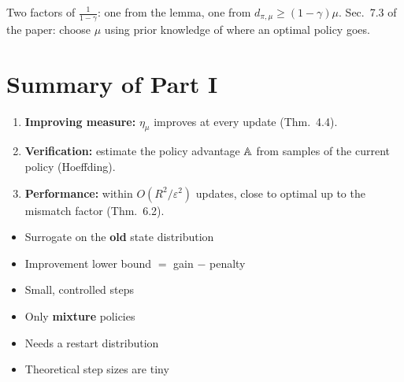 {\small Two factors of $\frac1{1-\gamma}$: one from the lemma, one from $d_{\pi,\mu}\ge(1-\gamma)\mu$. Sec.~7.3 of the paper: choose $\mu$ using prior knowledge of where an optimal policy goes.}

\section{Summary of Part I}

\begin{tcolorbox}[notes, colback=GoodGreen!5, colframe=GoodGreen, colbacktitle=GoodGreen, title={CPI's answers to the three questions}]
\begin{enumerate}[label=\textbf{Q\arabic*}]
  \item \textbf{Improving measure:} $\eta_\mu$ improves at every update (Thm.~4.4).
  \item \textbf{Verification:} estimate the policy advantage $\mathbb{A}$ from samples of the current policy (Hoeffding).
  \item \textbf{Performance:} within $O(R^2/\varepsilon^2)$ updates, close to optimal up to the mismatch factor (Thm.~6.2).
\end{enumerate}
\end{tcolorbox}

\begin{pair}
\begin{keybox}[title={Kept going forward}]
\begin{itemize}
  \item Surrogate on the \textbf{old} state distribution
  \item Improvement lower bound $=$ gain $-$ penalty
  \item Small, controlled steps
\end{itemize}
\end{keybox}
\begin{warnbox}[title={Limitations}]
\begin{itemize}
  \item Only \textbf{mixture} policies
  \item Needs a restart distribution
  \item Theoretical step sizes are tiny
\end{itemize}
\end{warnbox}
\end{pair}

